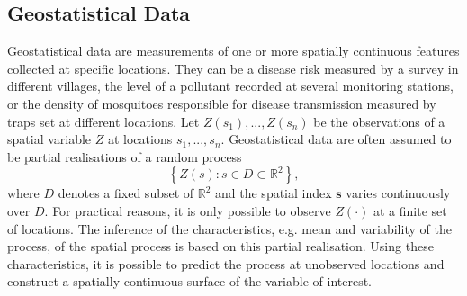 \subsection{Geostatistical Data}
Geostatistical data are measurements of one or more spatially continuous features collected at specific locations. They can be a disease risk measured by a survey in different villages, the level of a pollutant recorded at several monitoring stations, or the density of mosquitoes responsible for disease transmission measured by traps set at different locations. Let $Z\left(s_1\right), ..., Z\left(s_n\right)$ be the observations of a spatial variable $Z$ at locations $s_1,...,s_n$. Geostatistical data are often assumed to be partial realisations of a random process
\begin{equation}
    \left\lbrace Z\left( s\right):s\in D\subset\mathbb{R}^2\right\rbrace,
\end{equation}
where $D$ denotes a fixed subset of $\mathbb{R}^2$ and the spatial index $\pmb{s}$ varies continuously over $D$. For practical reasons, it is only possible to observe $Z\left(\cdot\right)$ at a finite set of locations. The inference of the characteristics, e.g. mean and variability of the process, of the spatial process is based on this partial realisation. Using these characteristics, it is possible to predict the process at unobserved locations and construct a spatially continuous surface of the variable of interest.

